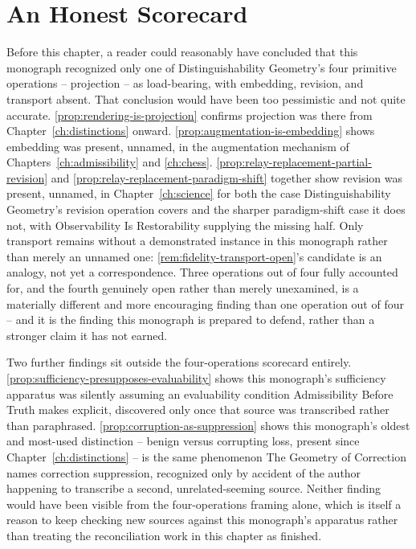 \section{An Honest Scorecard}

Before this chapter, a reader could reasonably have concluded that this
monograph recognized only one of Distinguishability Geometry's four
primitive operations -- projection -- as load-bearing, with embedding,
revision, and transport absent. That conclusion would have been too
pessimistic and not quite accurate. \cref{prop:rendering-is-projection}
confirms projection was there from Chapter~\ref{ch:distinctions} onward.
\cref{prop:augmentation-is-embedding} shows embedding was present, unnamed,
in the augmentation mechanism of Chapters~\ref{ch:admissibility} and
\ref{ch:chess}. \cref{prop:relay-replacement-partial-revision} and
\cref{prop:relay-replacement-paradigm-shift} together show revision was
present, unnamed, in Chapter~\ref{ch:science} for both the case
Distinguishability Geometry's revision operation covers and the sharper
paradigm-shift case it does not, with Observability Is Restorability
supplying the missing half. Only transport remains without a demonstrated
instance in this monograph rather than merely an unnamed one:
\cref{rem:fidelity-transport-open}'s candidate is an analogy, not yet a
correspondence. Three operations out of four fully accounted for, and the
fourth genuinely open rather than merely unexamined, is a materially
different and more encouraging finding than one operation out of four --
and it is the finding this monograph is prepared to defend, rather than a
stronger claim it has not earned.

Two further findings sit outside the four-operations scorecard entirely.
\cref{prop:sufficiency-presupposes-evaluability} shows this monograph's
sufficiency apparatus was silently assuming an evaluability condition
Admissibility Before Truth makes explicit, discovered only once that
source was transcribed rather than paraphrased. \cref{prop:corruption-as-suppression}
shows this monograph's oldest and most-used distinction -- benign versus
corrupting loss, present since Chapter~\ref{ch:distinctions} -- is the
same phenomenon The Geometry of Correction names correction suppression,
recognized only by accident of the author happening to transcribe a
second, unrelated-seeming source. Neither finding would have been visible
from the four-operations framing alone, which is itself a reason to keep
checking new sources against this monograph's apparatus rather than
treating the reconciliation work in this chapter as finished.

